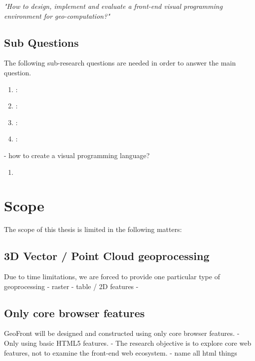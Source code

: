 \textit{"How to design, implement and evaluate a front-end visual programming environment for geo-computation?"}

\subsection*{Sub Questions}
The following sub-research questions are needed in order to answer the main question. 

\begin{enumerate}[a]
  \item {}: 
  \item {}:   
  \item {}: 
  \item {}:  
\end{enumerate}



- how to create a visual programming language?

\begin{enumerate}
  \item 
\end{enumerate}

\newpage
\section{Scope}
The scope of this thesis is limited in the following matters: 

\subsection{ 3D Vector / Point Cloud geoprocessing}
Due to time limitations, we are forced to provide one particular type of geoprocessing
- raster
- table / 2D features
- 


\subsection{ Only core browser features }
GeoFront will be designed and constructed using only core browser features. 
- Only using basic HTML5 features.
- The research objective is to explore core web features, not to examine the front-end web ecosystem. 
- name all html things



